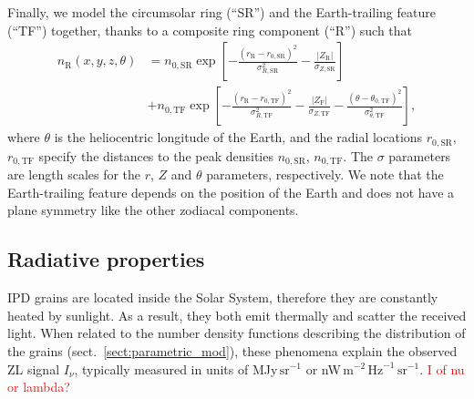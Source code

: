\documentclass{aa}
\newcommand{\angela}[0]{\textcolor{red}}
\begin{document}
Finally, we model the circumsolar ring (``SR'') and the Earth-trailing feature (``TF'') 
together, thanks to a composite ring component (``R'') such that 
\begin{align}
    n_\mathrm{R}(x, y, z, \theta)&=n_{0, \mathrm{SR}} \exp \left[-\frac{\left(r_\mathrm{R}-r_{0, \mathrm{SR}}\right)^2}{\sigma_{R,\mathrm{SR}} ^2}-\frac{\left| Z_\mathrm{R} \right|}{\sigma_{Z, \mathrm{SR}}}\right]\nonumber\\
   &+ n_{0, \mathrm{TF}} \exp \left[-\frac{\left(r_\mathrm{R}-r_{0,
          \mathrm{TF}}\right)^{2}}{\sigma_{R,
          \mathrm{TF}}^{2}}-\frac{\left|Z_\mathrm{F}\right|}{\sigma_{Z,
          \mathrm{TF}}}-\frac{\left(\theta-\theta_{0,
          \mathrm{TF}}\right)^{2}}{\sigma_{\theta,\mathrm{TF}}^{2}}\right],
    \label{eq:ring}
\end{align}
where $\theta$ is the heliocentric longitude of the Earth, and the 
radial locations $r_{0, \mathrm{SR}}$, $r_{0, \mathrm{TF}}$ specify
the distances to the peak densities $n_{0, \mathrm{SR}}$, 
$n_{0, \mathrm{TF}}$. The $\sigma$ parameters are length scales for the 
$r$, $Z$ and $\theta$ parameters, respectively. We note that the 
Earth-trailing feature depends on the position of the Earth and does not 
have a plane symmetry like the other zodiacal components. 

\subsection{Radiative properties}

IPD grains are located inside the Solar System, therefore they are constantly heated 
by sunlight. As a result, they both emit thermally and scatter the received light. 
When related to the number density functions describing the distribution 
of the grains (sect.~\ref{sect:parametric_mod}), these phenomena explain the 
observed ZL signal $I_{\nu}$, typically measured in units of MJy$\,\mathrm{sr}^{-1}$ or
nW$\,\mathrm{m}^{-2}\,\mathrm{Hz}^{-1}\,\mathrm{sr}^{-1}$. \angela{I of nu or lambda?}
\end{document}
